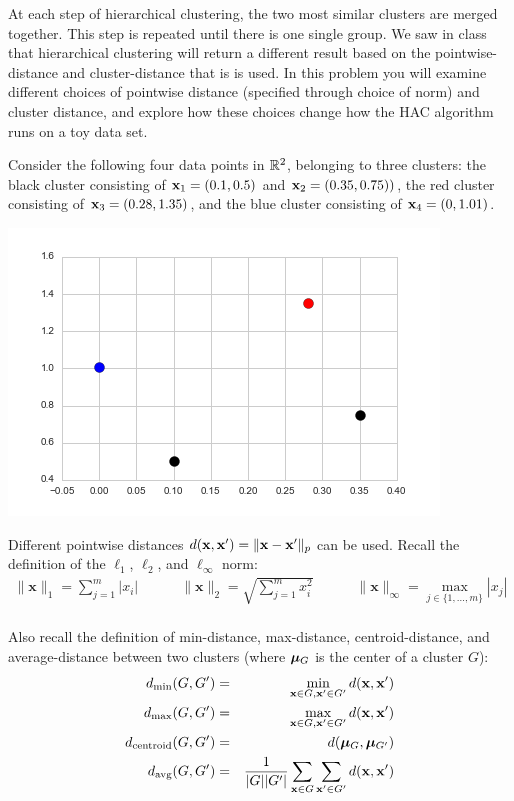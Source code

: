 \documentclass[submit]{harvardml}
\begin{document}
\begin{problem}
  
At each step of hierarchical clustering, the two most similar clusters
are merged together. This step is repeated until there is one single
group. We saw in class that hierarchical clustering will return a
different result based on the pointwise-distance and cluster-distance
that is is used. In this problem you will examine different choices of
pointwise distance (specified through choice of norm) and cluster
distance, and explore how these choices change how the HAC algorithm
runs on a toy data set.

  
 Consider the following four data points in $\mathbb{R}^2$, belonging to three clusters: the
  black cluster consisting of $\mathbf{x}_1 = (0.1, 0.5) $ and $\mathbf{x}_2 = (0.35, 0.75))$,
  the red cluster consisting of $\mathbf{x}_3 = (0.28, 1.35)$, and the blue cluster
  consisting of $\mathbf{x}_4 = (0, 1.01)$.

  \begin{center} \includegraphics[scale=.3]{scatterplot.png} \end{center}


  Different pointwise distances $d(\mathbf{x}, \mathbf{x}') = \|\mathbf{x} - \mathbf{x}'\|_p$
  can be used.  Recall the definition of the
  $\ell_1$, $\ell_2$, and $\ell_{\infty}$ norm:
  \begin{eqnarray*}
     \| \mathbf{x} \|_1 = \sum_{j = 1}^m |x_i| \quad \quad\quad \| \mathbf{x} \|_2 = \sqrt{\sum_{j = 1}^m x_i^2 } \quad\quad\quad
     \| \mathbf{x} \|_{\infty} = \max_{j \in \{1, \ldots, m\}} |x_j|\\
  \end{eqnarray*}
  
  Also recall the definition of min-distance, max-distance,
  centroid-distance, and average-distance between two clusters (where $\boldsymbol{\mu}_{G}$
is the center of a cluster $G$):
%
\begin{eqnarray*}
    d_{\text{min}}(G, G') &=& \min_{\mathbf{x}  \in G, \mathbf{x}' \in G'} d(\mathbf{x}, \mathbf{x}')\\
    d_{\text{max}}(G, G') &=& \max_{\mathbf{x}  \in G, \mathbf{x}' \in G'} d(\mathbf{x}, \mathbf{x}')\\
    d_{\text{centroid}}(G, G') &=&  d(\boldsymbol{\mu}_{G}, \boldsymbol{\mu}_{G'})\\
    d_{\text{avg}}(G, G') &=&\frac{1}{|G| |G'|} \sum_{\mathbf{x} \in G}\sum_{\mathbf{x}'  \in G'} d(\mathbf{x}, \mathbf{x}')\\
  \end{eqnarray*}


\end{problem}
\end{document}
